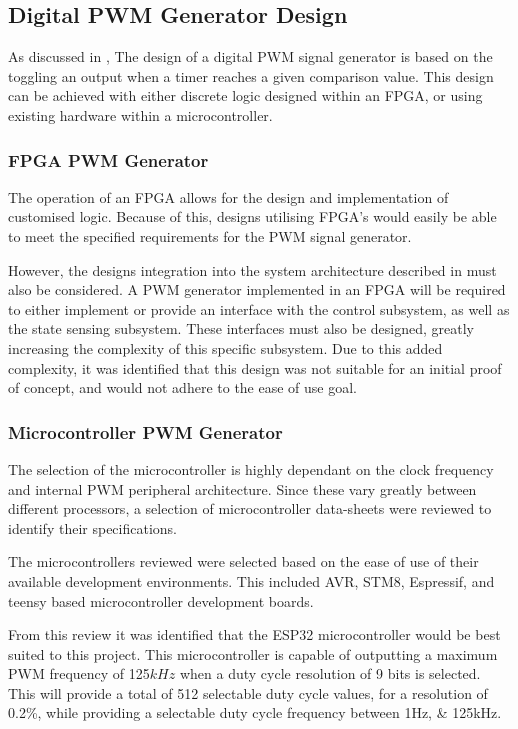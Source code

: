\subsection{Digital PWM Generator Design}\label{S:PWM_digital_design}

As discussed in , The design of a digital PWM signal generator is based on the toggling an output when a timer reaches a given comparison value. This design can be achieved with either discrete logic designed within an FPGA, or using existing hardware within a microcontroller. 

\subsubsection*{FPGA PWM Generator}

The operation of an FPGA allows for the design and implementation of customised logic. Because of this, designs utilising FPGA's would easily be able to meet the specified requirements for the PWM signal generator.

However, the designs integration into the system architecture described in  must also be considered. A PWM generator implemented in an FPGA will be required to either implement or provide an interface with the control subsystem, as well as the state sensing subsystem. These interfaces must also be designed, greatly increasing the complexity of this specific subsystem. Due to this added complexity, it was identified that this design was not suitable for an initial proof of concept, and would not adhere to the ease of use goal. 

\subsubsection*{Microcontroller PWM Generator}

The selection of the microcontroller is highly dependant on the clock frequency and internal PWM peripheral architecture. Since these vary greatly between different processors, a selection of microcontroller data-sheets were reviewed to identify their specifications. 

The microcontrollers reviewed were selected based on the ease of use of their available development environments. This included AVR, STM8, Espressif, and teensy based microcontroller development boards. 

From this review it was identified that the ESP32 microcontroller \cite{ESP32Manual} would be best suited to this project. This microcontroller is capable of outputting a maximum PWM frequency of 125$kHz$ when a duty cycle resolution of 9 bits is selected. This will provide a total of 512 selectable duty cycle values, for a resolution of 0.2\%, while providing a selectable duty cycle frequency between 1Hz, \& 125kHz. 

